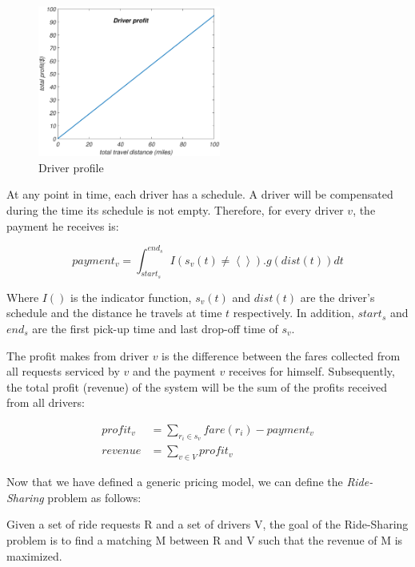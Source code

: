\begin{figure}[!ht]
	\centering
	\includegraphics[width = 60mm]{fig/driver.eps}
	\vspace{-0mm}\caption{Driver profile} \vspace{-2mm} \label{fig:driver_profile}
\end{figure}\vspace{-0mm}
 
At any point in time, each driver has a schedule. A driver will be compensated during the time its schedule is not empty. Therefore, for every driver $v$, the payment he receives is:

\begin{equation*}
payment_v = \int_{start_s}^{end_s} I\left( s_v(t) \neq \left\langle \right\rangle\right).g(dist(t))dt
\end{equation*}

\noindent Where $I()$ is the indicator function, $s_v(t)$ and $dist(t)$ are the driver's schedule and the distance he travels at time $t$ respectively. In addition, $start_s$ and $end_s$ are the first pick-up time and last drop-off time of $s_v$.

The profit \fname makes from driver $v$ is the difference between the fares collected from all requests serviced by $v$ and the payment $v$ receives for himself. Subsequently, the total profit (revenue) of the system will be the sum of the profits received from all drivers:

\begin{align*}
profit_v &= \sum_{r_i \in s_v}fare(r_i) - payment_v\\
revenue &= \sum_{v \in V}profit_v
\end{align*}

Now that we have defined a generic pricing model, we can define the \textit{Ride-Sharing} problem as follows:

\begin{definition} 
Given a set of ride requests R and a set of drivers V, the goal of the Ride-Sharing problem is to find a matching M between R and V such that the revenue of M is maximized.
\end{definition}

 




